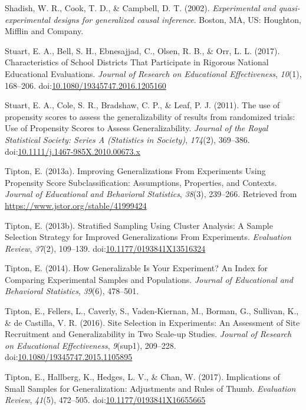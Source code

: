 \documentclass[man,floatsintext]{apa6}
\theoremstyle{definition}
\theoremstyle{definition}
\theoremstyle{definition}
\theoremstyle{remark}
\begin{document}
\leavevmode\hypertarget{ref-shadishExperimentalQuasiexperimentalDesigns2002}{}%
Shadish, W. R., Cook, T. D., \& Campbell, D. T. (2002).
\emph{Experimental and quasi-experimental designs for generalized causal
inference}. Boston, MA, US: Houghton, Mifflin and Company.

\leavevmode\hypertarget{ref-stuartCharacteristicsSchoolDistricts2017}{}%
Stuart, E. A., Bell, S. H., Ebnesajjad, C., Olsen, R. B., \& Orr, L. L.
(2017). Characteristics of School Districts That Participate in Rigorous
National Educational Evaluations. \emph{Journal of Research on
Educational Effectiveness}, \emph{10}(1), 168--206.
doi:\href{https://doi.org/10.1080/19345747.2016.1205160}{10.1080/19345747.2016.1205160}

\leavevmode\hypertarget{ref-stuartUsePropensityScores2011}{}%
Stuart, E. A., Cole, S. R., Bradshaw, C. P., \& Leaf, P. J. (2011). The
use of propensity scores to assess the generalizability of results from
randomized trials: Use of Propensity Scores to Assess Generalizability.
\emph{Journal of the Royal Statistical Society: Series A (Statistics in
Society)}, \emph{174}(2), 369--386.
doi:\href{https://doi.org/10.1111/j.1467-985X.2010.00673.x}{10.1111/j.1467-985X.2010.00673.x}

\leavevmode\hypertarget{ref-tiptonImprovingGeneralizationsExperiments2013}{}%
Tipton, E. (2013a). Improving Generalizations From Experiments Using
Propensity Score Subclassification: Assumptions, Properties, and
Contexts. \emph{Journal of Educational and Behavioral Statistics},
\emph{38}(3), 239--266. Retrieved from
\url{https://www.jstor.org/stable/41999424}

\leavevmode\hypertarget{ref-tiptonStratifiedSamplingUsing2013}{}%
Tipton, E. (2013b). Stratified Sampling Using Cluster Analysis: A Sample
Selection Strategy for Improved Generalizations From Experiments.
\emph{Evaluation Review}, \emph{37}(2), 109--139.
doi:\href{https://doi.org/10.1177/0193841X13516324}{10.1177/0193841X13516324}

\leavevmode\hypertarget{ref-tiptonHowGeneralizableYour2014}{}%
Tipton, E. (2014). How Generalizable Is Your Experiment? An Index for
Comparing Experimental Samples and Populations. \emph{Journal of
Educational and Behavioral Statistics}, \emph{39}(6), 478--501.

\leavevmode\hypertarget{ref-tiptonSiteSelectionExperiments2016}{}%
Tipton, E., Fellers, L., Caverly, S., Vaden-Kiernan, M., Borman, G.,
Sullivan, K., \& de Castilla, V. R. (2016). Site Selection in
Experiments: An Assessment of Site Recruitment and Generalizability in
Two Scale-up Studies. \emph{Journal of Research on Educational
Effectiveness}, \emph{9}(sup1), 209--228.
doi:\href{https://doi.org/10.1080/19345747.2015.1105895}{10.1080/19345747.2015.1105895}

\leavevmode\hypertarget{ref-tiptonImplicationsSmallSamples2017}{}%
Tipton, E., Hallberg, K., Hedges, L. V., \& Chan, W. (2017).
Implications of Small Samples for Generalization: Adjustments and Rules
of Thumb. \emph{Evaluation Review}, \emph{41}(5), 472--505.
doi:\href{https://doi.org/10.1177/0193841X16655665}{10.1177/0193841X16655665}

\endgroup
\end{document}
